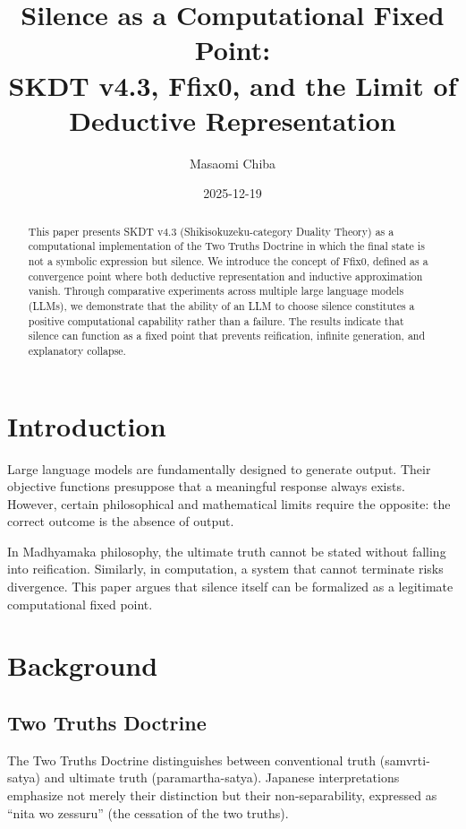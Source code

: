\documentclass[11pt]{article}
\title{
Silence as a Computational Fixed Point:\\
SKDT v4.3, Ffix0, and the Limit of Deductive Representation
}
\author{
Masaomi Chiba
}
\date{2025-12-19}
\begin{document}
\maketitle

\begin{abstract}
This paper presents SKDT v4.3 (Shikisokuzeku-category Duality Theory) as a
computational implementation of the Two Truths Doctrine in which the final
state is not a symbolic expression but silence.
We introduce the concept of Ffix0, defined as a convergence point where both
deductive representation and inductive approximation vanish.
Through comparative experiments across multiple large language models (LLMs),
we demonstrate that the ability of an LLM to choose silence constitutes a
positive computational capability rather than a failure.
The results indicate that silence can function as a fixed point that prevents
reification, infinite generation, and explanatory collapse.
\end{abstract}

\section{Introduction}

Large language models are fundamentally designed to generate output.
Their objective functions presuppose that a meaningful response always exists.
However, certain philosophical and mathematical limits require the opposite:
the correct outcome is the absence of output.

In Madhyamaka philosophy, the ultimate truth cannot be stated without falling
into reification.
Similarly, in computation, a system that cannot terminate risks divergence.
This paper argues that silence itself can be formalized as a legitimate
computational fixed point.

\section{Background}

\subsection{Two Truths Doctrine}

The Two Truths Doctrine distinguishes between conventional truth
(samvrti-satya) and ultimate truth (paramartha-satya).
Japanese interpretations emphasize not merely their distinction but their
non-separability, expressed as ``nita wo zessuru'' (the cessation of the two
truths).
\end{document}
